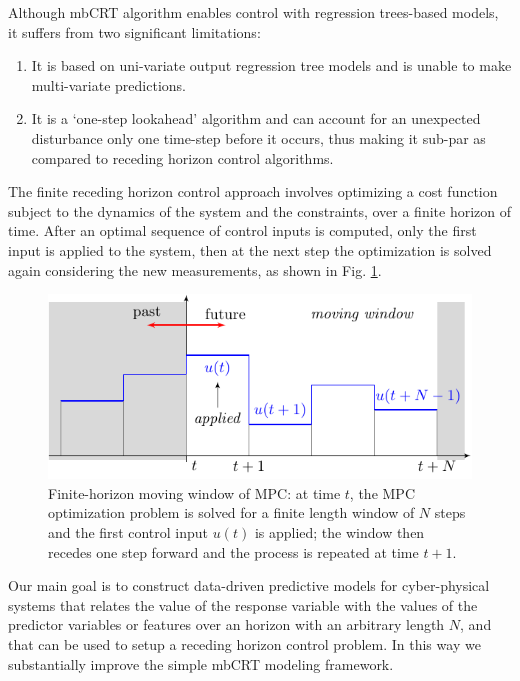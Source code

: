 \textcolor[rgb]{1.00,0.00,0.00}{Although mbCRT algorithm enables control with regression trees-based models, it suffers from two significant limitations:
\begin{enumerate}[leftmargin=1cm]
	\item It is based on uni-variate output regression tree models and is unable to make multi-variate predictions. 
	\item It is a `one-step lookahead' algorithm and can account for an unexpected disturbance only one time-step before it occurs, thus making it sub-par as compared to receding horizon control algorithms.
\end{enumerate}
The finite receding horizon control approach involves optimizing a cost function subject to the dynamics of the system and the constraints, over a finite horizon of time. After an optimal sequence of control inputs is computed, only the first input is applied to the system, then at the next step the optimization is solved again considering the new measurements, as shown in Fig. \ref{F:MPC-illust}.} 
\begin{figure}
	\centering
	\includegraphics[scale=0.85]{Figures/receding_horizon.pdf}
	\caption{Finite-horizon moving window of MPC: at time $t$, the MPC optimization problem is solved for a finite length window of $N$ steps and the first control input $u(t)$ is applied; the window then recedes one step forward and the process is repeated at time $t+1$.}
	\captionsetup{justification=centering}
	\label{F:MPC-illust}
\end{figure} 
\textcolor[rgb]{1.00,0.00,0.00}{Our main goal is to construct data-driven predictive models for cyber-physical systems that relates the value of the response variable with the values of the predictor variables or features over an horizon with an arbitrary length $N$, and that can be used to setup a receding horizon control problem. In this way we substantially improve the simple mbCRT modeling framework.}

